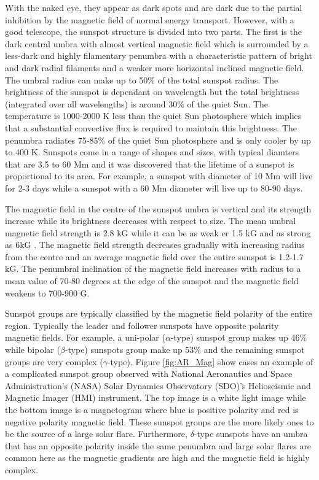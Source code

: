 	With the naked eye, they appear as dark spots and are dark due to the partial inhibition by the magnetic field  of normal energy transport.
	However, with a good telescope, the sunspot structure is divided into two parts.
	The first is the dark central umbra with almost vertical magnetic field which is surrounded by a less-dark and highly filamentary penumbra with a characteristic pattern of bright and dark radial filaments and a weaker more horizontal inclined magnetic field.
	The umbral radius can make up to 50\% of the total sunspot radius.
	The brightness of the sunspot is dependant on wavelength but the total brightness (integrated over all wavelengths) is around 30\% of the quiet Sun.
	The temperature is 1000-2000 K less than the quiet Sun photosphere which implies that a substantial convective flux is required to maintain this brightness.
	The penumbra radiates 75-85\% of the quiet Sun photosphere and is only cooler by up to 400 K.
	Sunspots come in a range of shapes and sizes, with typical diamters that are 3.5 to 60 Mm and it was discovered that the lifetime of a sunspot is proportional to its area. 
	For example, a sunspot with diameter of 10 Mm will live for 2-3 days while a sunspot with a 60 Mm diameter will live up to 80-90 days.
	
	The magnetic field in the centre of the sunspot umbra is vertical and its strength increase while its brightness decreases with respect to size.
	The mean umbral magnetic field strength is 2.8 kG while it can be as weak er 1.5 kG and as strong as 6kG \citep{2006SoPh..239...41L}.
	The magnetic field strength decreases gradually with increasing radius from the centre and an average magnetic field over the entire sunspot is 1.2-1.7 kG.
	The penumbral inclination of the magnetic field increases with radius to a mean value of 70-80 degrees at the edge of the sunspot and the magnetic field weakens to 700-900 G.

	Sunspot groups are typically classified by the magnetic field polarity of the entire region.
	Typically the leader and follower sunspots have opposite polarity magnetic fields.
	For example, a uni-polar ($\alpha$-type) sunspot group makes up 46\% while bipolar ($\beta$-type) sunspots group make up 53\% and the remaining sunspot groups are very complex ($\gamma$-type).
	Figure \ref{fig:AR_Mag} show cases an example of a complicated sunspot group observed with National Aeronautics and Space Administration's (NASA) Solar Dynamics Observatory (SDO)'s Helioseismic and Magnetic Imager (HMI) instrument.
	The top image is a white light image while the bottom image is a magnetogram where blue is positive polarity and red is negative polarity magnetic field.
	These sunspot groups are the more likely ones to be the source of a large solar flare.
	Furthermore, $\delta$-type sunspots have an umbra that has an opposite polarity inside the same penumbra and large solar flares are common here as the magnetic gradients are high and the magnetic field is highly complex.
	
